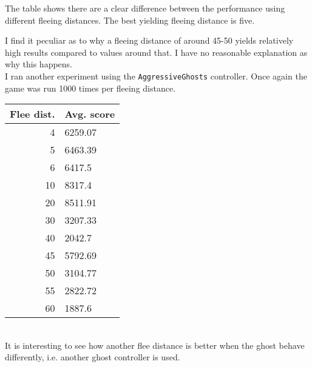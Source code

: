 \noindent
The table shows there are a clear difference between the performance using different fleeing distances. The best yielding fleeing distance is five.

I find it peculiar as to why a fleeing distance of around 45-50 yields relatively high results compared to values around that. I have no reasonable explanation as why this happens. \\

\noindent
I ran another experiment using the \texttt{AggressiveGhosts} controller. Once again the game was run 1000 times per fleeing distance. \\

\begin{tabular}{ | r | l | }
	\hline
	Flee dist. & Avg. score \\ \hline
	4 & 6259.07 \\ \hline
	5 & 6463.39 \\ \hline
	6 & 6417.5 \\ \hline
	10 & 8317.4 \\ \hline
	20 & 8511.91 \\ \hline
	30 & 3207.33 \\ \hline
	40 & 2042.7 \\ \hline
	45 & 5792.69 \\ \hline
	50 & 3104.77 \\ \hline
	55 & 2822.72 \\ \hline
	60 & 1887.6 \\
	\hline
\end{tabular} \\

It is interesting to see how another flee distance is better when the ghost behave differently, i.e. another ghost controller is used. 






















